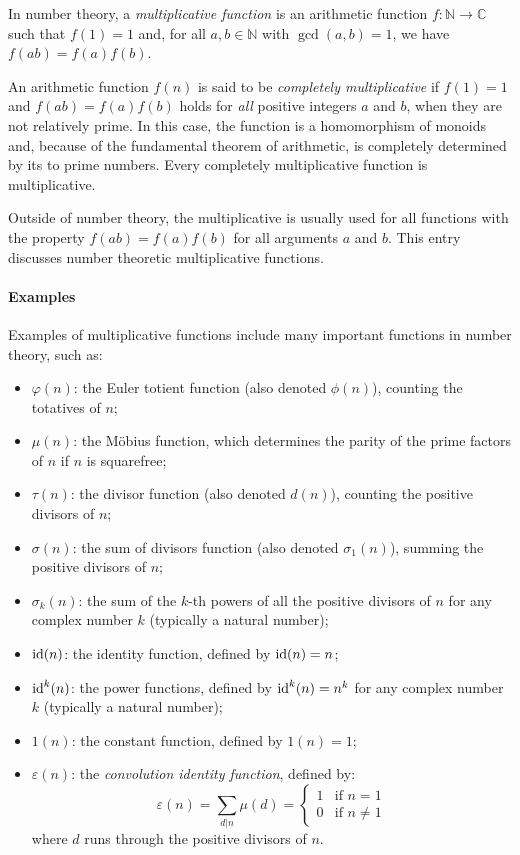 \documentclass[12pt]{article}
\begin{document}

In number theory, a \emph{multiplicative function} is an arithmetic function $f \colon \mathbb{N} \to \mathbb{C}$ such that $f(1)=1$ and, for all $a,b \in \mathbb{N}$ with $\gcd(a,b)=1$, we have $f(ab)=f(a)f(b)$.

An arithmetic function $f(n)$ is said to be \emph{completely multiplicative} if $f(1)=1$ and $f(ab)=f(a)f(b)$ holds for \emph{all} positive integers $a$ and $b$,  when they are not relatively prime.  In this case, the function is a homomorphism of monoids and, because of the fundamental theorem of arithmetic, is completely determined by its  to prime numbers.  Every completely multiplicative function is multiplicative.

Outside of number theory, the  multiplicative is usually used for all functions with the property $f(ab)=f(a)f(b)$ for all arguments $a$ and $b$. This entry discusses number theoretic multiplicative functions. 

\paragraph{Examples}

Examples of multiplicative functions include many important functions in number theory, such as: 

\begin{itemize}
\item $\varphi(n)$: the Euler totient function (also denoted $\phi(n)$), counting the totatives of $n$;
\item $\mu(n)$: the M\"{o}bius function, which determines the parity of the prime factors of $n$ if $n$ is squarefree;
\item $\tau(n)$: the divisor function (also denoted $d(n)$), counting the positive divisors of $n$;
\item $\sigma(n)$: the sum of divisors function (also denoted $\sigma_1(n)$), summing the positive divisors of $n$;
\item $\sigma_{k}(n)$: the sum of the $k$-th powers of all the positive divisors of $n$ for any complex number $k$ (typically a natural number);
\item $\hbox{id}(n)$: the identity function, defined by $\hbox{id}(n) = n$;
\item $\hbox{id}^{k}(n)$: the power functions, defined by $\hbox{id}^{k}(n) = n^{k}$ for any complex number $k$ (typically a natural number);
\item $1(n)$: the constant function, defined by $1(n)=1$;
\item $\varepsilon(n)$: the \emph{convolution identity function}, defined by:
\[
\varepsilon(n) = \sum_{d|n} \mu(d) =
\begin{cases}
1 &\text{if } n=1 \\
0 &\text{if } n\neq 1
\end{cases}
\]
where $d$ runs through the positive divisors of $n$.
\end{itemize}
\end{document}
